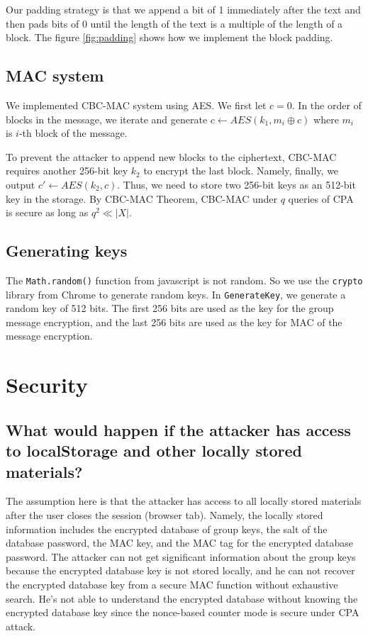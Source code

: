 Our padding strategy is that we append a bit of 1 immediately after the text and then pads bits of 0 until the length of the text is a multiple of the length of a block. The figure \ref{fig:padding} shows how we implement the block padding. 

\subsection{MAC system}
We implemented CBC-MAC system using AES. 
We first let $c = 0$. In the order of blocks in the message, we iterate and generate $c \gets AES(k_1, m_i \oplus c)$ where $m_i$ is $i$-th block of the message. 

To prevent the attacker to append new blocks to the ciphertext, CBC-MAC requires another 256-bit key $k_2$ to encrypt the last block. Namely, finally, we output $c' \gets AES(k_2, c)$. Thus, we need to store two 256-bit keys as an 512-bit key in the storage. 
By CBC-MAC Theorem, CBC-MAC under $q$ queries of CPA is secure as long as  $q^2 \ll |X|$.

\subsection{Generating keys}
The \texttt{Math.random()} function from javascript is not random. So we use the \texttt{crypto} library from Chrome to generate random keys. In \texttt{GenerateKey}, we generate a random key of 512 bits. The first 256 bits are used as the key for the group message encryption, and the last 256 bits are used as the key for MAC of the message encryption. 

\section{Security}
\subsection{What would happen if the attacker has access to localStorage and other locally stored materials? }
The assumption here is that the attacker has access to all locally stored materials after the user closes the session (browser tab). Namely, the locally stored information includes the encrypted database of  group keys, the salt of the database password, the MAC key, and the MAC tag for the encrypted database password. The attacker can not get significant information about the group keys because the encrypted database key is not stored locally, and he can not recover the encrypted database key from a secure MAC function without exhaustive search. He's not able to understand the encrypted database without knowing the encrypted database key since the nonce-based counter mode is secure under CPA attack. 
